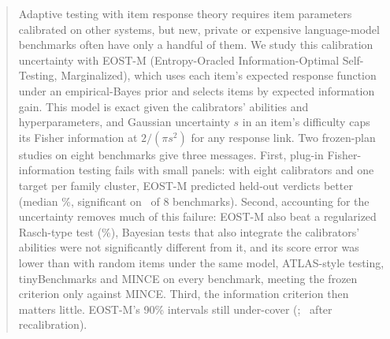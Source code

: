 \begin{abstract}
Adaptive testing with item response theory requires item parameters calibrated on other
systems, but new, private or expensive language-model benchmarks often have only a
handful of them. We study this calibration uncertainty with EOST-M (Entropy-Oracled
Information-Optimal Self-Testing, Marginalized), which uses each item's expected response
function under an empirical-Bayes prior and selects items by expected information gain. This
model is exact given the calibrators' abilities and hyperparameters, and Gaussian
uncertainty $s$ in an item's difficulty caps its Fisher information at $2/(\pi s^2)$ for any
response link. Two frozen-plan studies on eight benchmarks give three messages. First,
plug-in Fisher-information testing fails with small panels: with eight calibrators and one
target per family cluster, EOST-M predicted held-out verdicts better (median
\STwoRTwoMed\%, significant on \STwoRTwoFav\ of 8 benchmarks). Second, accounting for the
uncertainty removes much of this failure: EOST-M also beat a regularized
Rasch-type test (\STwoCOneMed\%), Bayesian tests that also integrate the calibrators'
abilities were not significantly different from it, and its score error was lower than with
random items under the same model, ATLAS-style testing, tinyBenchmarks and MINCE on every
benchmark, meeting the frozen criterion only against MINCE. Third, the information criterion
then matters little. EOST-M's 90\% intervals still under-cover (\STwoCoveigmg;
\STwoCoveigmgRR\ after recalibration).
\end{abstract}
